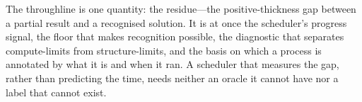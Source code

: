 \documentclass[twocolumn,10pt,a4paper]{article}
\theoremstyle{thmstyle}
\theoremstyle{definition}
\theoremstyle{remark}
\begin{document}
The throughline is one quantity: the residue---the positive-thickness gap
between a partial result and a recognised solution. It is at once the
scheduler's progress signal, the floor that makes recognition possible,
the diagnostic that separates compute-limits from structure-limits, and
the basis on which a process is annotated by what it is and when it ran.
A scheduler that measures the gap, rather than predicting the time, needs
neither an oracle it cannot have nor a label that cannot exist.



\end{document}
